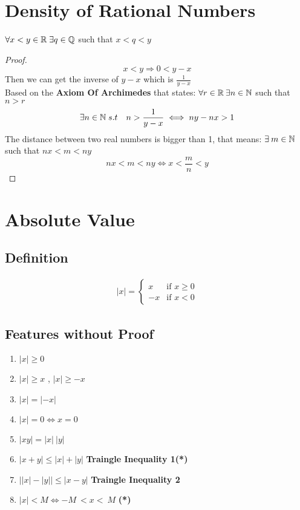 \section{Density of Rational Numbers}
$\forall x<y\in \mathbb{R} \; \exists q\in \mathbb{Q}$ such that $x<q<y$\\ 

\begin{proof}
    \[
        x<y \Longrightarrow 0 < y-x 
    \]
    Then we can get the inverse of $y-x$ which is $\frac{1}{y-x}$\\
    Based on the \textbf{Axiom Of Archimedes} that states: $\forall r\in \mathbb{R}\: \exists n\in \mathbb{N}$ such that $n>r$\\
    \[
        \exists n\in \mathbb{N}\; s.t \quad n>\frac{1}{y-x} \iff ny-nx>1
    \]
    The distance between two real numbers is bigger than 1, that means: $\exists \: m\in \mathbb{N}$ such that $nx<m<ny$\\
    \[
        nx<m<ny \iff x<\frac{m}{n}<y
    \]
\end{proof}

\section{Absolute Value}
\subsection{Definition}
\begin{align*}
    |x| = \left\{
    \begin{array}{ll}
    x & \text{if } x \geq 0 \\
    -x & \text{if } x < 0
    \end{array}
    \right.
\end{align*}

\newpage
\subsection{Features without Proof}
\begin{enumerate}
    \item $|x|\geq 0$
    \item $|x| \geq x$ , $|x| \geq -x$
    \item $|x| = |-x|$
    \item $|x| = 0 \iff x = 0$
    \item $|xy| = |x|\:|y|$
    \item $|x+y|\leq |x|+|y|$ \textbf{Traingle Inequality 1(*)}
    \item $\Big| |x| - |y| \Big| \leq \Big| x - y \Big|$ \textbf{Traingle Inequality 2}
    \item \label{abs:open-abs}$|x| < M \iff -M\: <x<\: M$ \textbf{(*)}
\end{enumerate}

